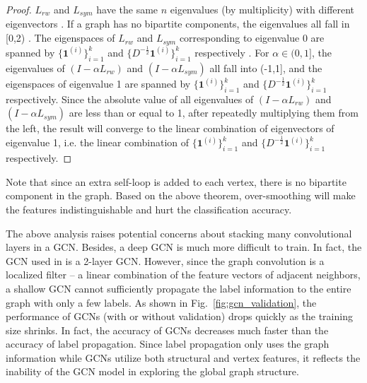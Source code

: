 \documentclass[letterpaper]{article} \usepackage{aaai18}  \usepackage{times}  \usepackage{helvet}  \usepackage{courier}  \usepackage{url}  \usepackage{graphicx}  \usepackage{algorithm}
\begin{document}
\begin{proof}
    $L_{rw}$ and $L_{sym}$ have the same $n$ eigenvalues (by multiplicity) with different eigenvectors \cite{von2007tutorial}. If a graph has no bipartite components, the eigenvalues all fall in [0,2) \cite{Chung97}. The eigenspaces of $L_{rw}$ and $L_{sym}$ corresponding to eigenvalue 0 are spanned by $\{\mathbf{1}^{(i)}\}_{i=1}^{k}$ and $\{D^{-\frac{1}{2}}\mathbf{1}^{(i)}\}_{i=1}^{k}$
    respectively \cite{von2007tutorial}. For $\alpha\in(0,1]$, the eigenvalues of $(I-\alpha L_{rw})$ and $(I-\alpha L_{sym})$ all fall into (-1,1], and the eigenspaces of eigenvalue 1 are spanned by $\{\mathbf{1}^{(i)}\}_{i=1}^{k}$ and $\{D^{-\frac{1}{2}}\mathbf{1}^{(i)}\}_{i=1}^{k}$ respectively.
    Since the absolute value of all eigenvalues of $(I-\alpha L_{rw})$ and $(I-\alpha L_{sym})$ are less than or equal to 1, after repeatedly multiplying them from the left, the result will converge to the linear combination of eigenvectors of eigenvalue 1, i.e. the linear combination of $\{\mathbf{1}^{(i)}\}_{i=1}^{k}$ and $\{D^{-\frac{1}{2}}\mathbf{1}^{(i)}\}_{i=1}^{k}$ respectively.
\end{proof}
Note that since an extra self-loop is added to each vertex, there is no bipartite component in the graph. Based on the above theorem, over-smoothing will make the features indistinguishable and hurt the classification accuracy.



The above analysis raises potential concerns about stacking many convolutional layers in a GCN. Besides, a deep GCN is much more difficult to train. In fact, the GCN used in \cite{kipf2016semi} is a 2-layer GCN. However, since the graph convolution is a localized filter -- a linear combination of the feature vectors of adjacent neighbors, a shallow GCN cannot sufficiently propagate the label information to the entire graph with only a few labels. As shown in Fig.~\ref{fig:gcn_validation}, the performance of GCNs (with or without validation) drops quickly as the training size shrinks. In fact, the accuracy of GCNs decreases much faster than the accuracy of label propagation. Since label propagation only uses the graph information while GCNs utilize both structural and vertex features, it reflects the inability of the GCN model in exploring the global graph structure.
\end{document}
